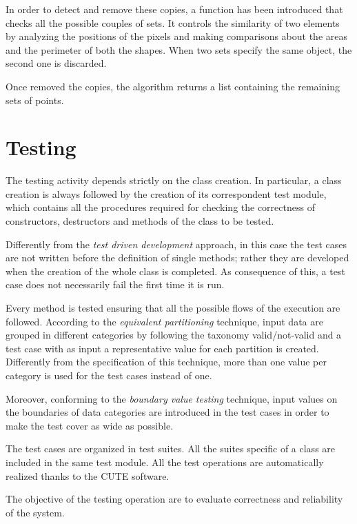 		

		In order to detect and remove these copies, a function has been introduced that checks all the possible couples of sets. 
		It controls the similarity of two elements by analyzing the positions of the pixels and making comparisons about the areas and the perimeter of both the shapes. 
		When two sets specify the same object, the second one is discarded. 
		
		Once removed the copies, the algorithm returns a list containing the remaining sets of points.

	

	\section{Testing}
	The testing activity depends strictly on the class creation.
	In particular, a class creation is always followed by the creation of its correspondent test module, which contains all the procedures required for checking the correctness of constructors, destructors and methods of the class to be tested.
	
	Differently from the \emph{test driven development} approach, in this case the test cases are not written before the definition of single methods; rather they are developed when the creation of the whole class is completed.
	As consequence of this, a test case does not necessarily fail the first time it is run. 
	
	Every method is tested ensuring that all the possible flows of the execution are followed.
	According to the \emph{equivalent partitioning} technique, input data are grouped in different categories by following the taxonomy valid/not-valid and a test case with as input a representative value for each partition is created. 
	Differently from the specification of this technique, more than one value per category is used for the test cases instead of one.

	Moreover, conforming to the \emph{boundary value testing} technique, input values on the boundaries of data categories are introduced in the test cases in order to make the test cover as wide as possible. 

	The test cases are organized in test suites. All the suites specific of a class are included in the same test module. 
	All the test operations are automatically realized thanks to the CUTE software.

	The objective of the testing operation are to evaluate correctness and reliability of the system.



